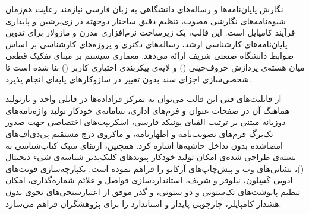 %
%

\begin{persianabstract}
نگارش پایان‌نامه‌ها و رساله‌های دانشگاهی به زبان فارسی نیازمند رعایت هم‌زمان شیوه‌نامه‌های نگارشی مصوب، تنظیم دقیق ساختار دوجهته در زی‌پرشین و پایداری فرآیند کامپایل است. این قالب، یک زیرساخت نرم‌افزاری مدرن و ماژولار برای تدوین پایان‌نامه‌های کارشناسی ارشد، رساله‌های دکتری و پروژه‌های کارشناسی بر اساس ضوابط دانشگاه صنعتی شریف ارائه می‌دهد. معماری سیستم بر مبنای تفکیک قطعی میان هسته‌ی پردازش حروف‌چینی () و لایه‌ی پیکربندی اختیاری کاربر () بنا شده است تا شخصی‌سازی اجزای سند بدون تغییر در سازوکارهای پایه‌ای انجام پذیرد.

از قابلیت‌های فنی این قالب می‌توان به تمرکز فراداده‌ها در فایلی واحد و بازتولید هماهنگ آن در صفحات عنوان و فرم‌های اداری، سامانه‌ی خودکار تولید واژه‌نامه‌های دوزبانه مبتنی بر ترتیب الفبای یونیکد فارسی، اسکریپت‌های اختصاصی جهت صدور تک‌برگ فرم‌های تصویب‌نامه و اظهارنامه، و ماکروی درج مستقیم پی‌دی‌اف‌های امضاشده بدون تداخل حاشیه‌ها اشاره کرد. همچنین، ارتقای سبک کتاب‌شناسی به بسته‌ی طراحی شده‌ی  امکان تولید خودکار پیوندهای کلیک‌پذیر شناسه‌ی شیء دیجیتال ()، نشانی‌های وب و پیش‌چاپ‌های آرکایو را فراهم نموده است. یکپارچه‌سازی فونت‌های ادوبی کَسِلون، نیلوفر و شریف، استانداردسازی فواصل و علائم شماره‌گذاری، امکان تنظیم پانوشت‌های تک‌ستونی و دو ستونی، و گذر موفق از اعتبارسنجی‌های نحوی بدون هشدار کامپایلر، چارچوبی پایدار و استاندارد را برای پژوهشگران فراهم می‌سازد.

\end{persianabstract}
